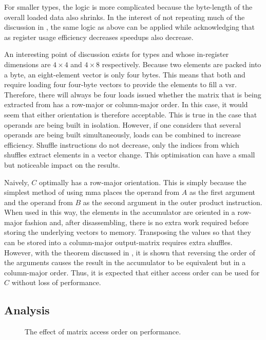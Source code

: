 \documentclass[\main/thesis.tex]{subfiles}
\begin{document}
For smaller types, the logic is more complicated because the byte-length of the overall loaded data also shrinks.
In the interest of not repeating much of the discussion in , the same logic as above can be applied while acknowledging that as register usage efficiency decreases speedups also decrease.

An interesting point of discussion exists for types  and  whose in-register dimensions are $4 \times 4$ and $4 \times 8$ respectively.
Because two  elements are packed into a byte, an eight-element vector is only four bytes.
This means that both  and  require loading four four-byte vectors to provide the elements to fill a \gls{vsr}.
Therefore, there will always be four loads issued whether the matrix that is being extracted from has a row-major or column-major order.
In this case, it would seem that either orientation is therefore acceptable.
This is true in the case that operands are being built in isolation.
However, if one considers that several operands are being built simultaneously, loads can be combined to increase efficiency.
Shuffle instructions do not decrease, only the indices from which shuffles extract elements in a vector change.
This optimisation can have a small but noticeable impact on the results.

Naively, $C$ optimally has a row-major orientation.
This is simply because the simplest method of using \gls{mma} places the operand from $A$ as the first argument and the operand from $B$ as the second argument in the outer product instruction.
When used in this way, the elements in the accumulator are oriented in a row-major fashion and, after disassembling, there is no extra work required before storing the underlying vectors to memory.
Transposing the values so that they can be stored into a column-major output-matrix requires extra shuffles.
However, with the theorem discussed in , it is shown that reversing the order of the arguments causes the result in the accumulator to be equivalent but in a column-major order.
Thus, it is expected that either access order can be used for $C$ without loss of performance.

\subsection{Analysis}
\begin{figure}[t]
  \centering
  
  \caption{The effect of matrix access order on performance.}
  \label{fig:accessOrder}
\end{figure}
\end{document}
